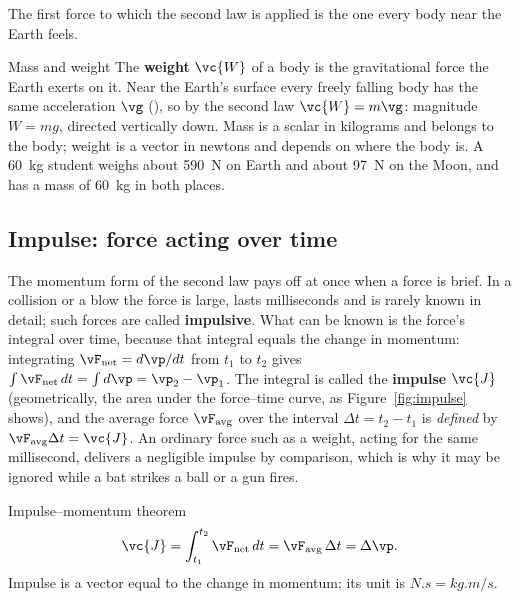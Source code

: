 The first force to which the second law is applied is the one every body near the Earth feels.

\begin{defbox}{Mass and weight}
The \textbf{weight} $\vc{W}$ of a body is the gravitational force the Earth exerts on it. Near the
Earth's surface every freely falling body has the same acceleration $\vg$ (),
so by the second law $\vc{W}=m\vg$: magnitude $W=mg$, directed vertically down. Mass is a scalar in
kilograms and belongs to the body; weight is a vector in newtons and depends on where the body is. A
\SI{60}{kg} student weighs about \SI{590}{N} on Earth and about \SI{97}{N} on the Moon, and has a mass
of \SI{60}{kg} in both places.
\end{defbox}

\subsection{Impulse: force acting over time}

The momentum form of the second law pays off at once when a force is brief. In a collision or a blow
the force is large, lasts milliseconds and is rarely known in detail; such forces are called
\textbf{impulsive}. What can be known is the force's integral over time, because that integral equals
the change in momentum: integrating $\vF_{\text{net}}=d\vp/dt$ from $t_1$ to $t_2$ gives
$\int\vF_{\text{net}}\,dt=\int d\vp=\vp_2-\vp_1$. The integral is called the \textbf{impulse} $\vc{J}$ (geometrically, the area under the force--time
curve, as Figure~\ref{fig:impulse} shows),
and the average force $\vF_{\text{avg}}$ over the interval $\Delta t=t_2-t_1$ is \emph{defined} by
$\vF_{\text{avg}}\Delta t=\vc{J}$. An ordinary force such as a weight, acting for
the same millisecond, delivers a negligible impulse by comparison, which is why it may be ignored while a
bat strikes a ball or a gun fires.

\begin{keybox}{Impulse--momentum theorem}
\[
\vc{J}=\int_{t_1}^{t_2}\vF_{\text{net}}\,dt=\vF_{\text{avg}}\,\Delta t=\Delta\vp.
\]
Impulse is a vector equal to the change in momentum; its unit is $\si{N.s}=\si{kg.m/s}$.
\end{keybox}

\begin{figure}[htbp]
\centering
{}
\end{figure}


